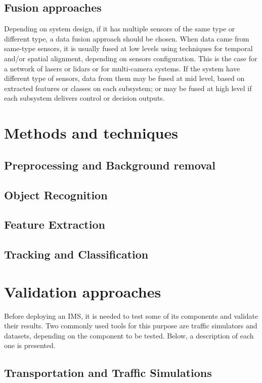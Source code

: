 \subsection{Fusion approaches}

Depending on system design, if it has multiple sensors of the same type or different type, a data fusion approach should be chosen. When data came from same-type sensors, it is usually fused at low levels using techniques for temporal and/or spatial alignment, depending on sensors configuration. This is the case for a network of lasers or lidars or for multi-camera systems. If the system have different type of sensors, data from them may be fused at mid level, based on  extracted features or classes on each subsystem; or may be fused at high level if each subsystem delivers control or decision outputs.

\section{Methods and techniques}

\subsection{Preprocessing and Background removal}
\subsection{Object Recognition}
\subsection{Feature Extraction}
\subsection{Tracking and Classification}

\section{Validation approaches}

Before deploying an IMS, it is needed to test some of its components and validate their results. Two commonly used tools for this purpose are traffic simulators and datasets, depending on the component to be tested. Below, a description of each one is presented.

\subsection{Transportation and Traffic Simulations}
